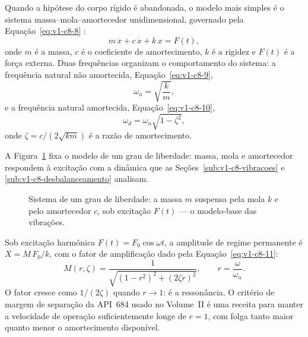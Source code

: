 \documentclass[12pt,a4paper]{article}
\numberwithin{equation}{section}
\numberwithin{table}{section}
\numberwithin{figure}{section}
\begin{document}
Quando a hipótese do corpo rígido é abandonada, o modelo mais simples é o
sistema massa--mola--amortecedor unidimensional, governado pela
Equação~\eqref{eq:v1-c8-8} \cite{rao2011}:
\begin{equation}\label{eq:v1-c8-8}
m\,\ddot{x} + c\,\dot{x} + k\,x = F(t),
\end{equation}
onde $m$ é a massa, $c$ é o coeficiente de amortecimento, $k$ é a rigidez e
$F(t)$ é a força externa. Duas frequências organizam o comportamento do
sistema: a frequência natural não amortecida, Equação~\eqref{eq:v1-c8-9},
\begin{equation}\label{eq:v1-c8-9}
\omega_n = \sqrt{\frac{k}{m}},
\end{equation}
e a frequência natural amortecida, Equação~\eqref{eq:v1-c8-10},
\begin{equation}\label{eq:v1-c8-10}
\omega_d = \omega_n\sqrt{1-\zeta^2},
\end{equation}
onde $\zeta = c/(2\sqrt{km})$ é a razão de amortecimento.

A Figura~\ref{fig:v1-c8-1} fixa o modelo de um grau de liberdade: massa,
mola e amortecedor respondem à excitação com a dinâmica que as
Seções~\ref{sub:v1-c8-vibracoes} e \ref{sub:v1-c8-desbalanceamento}
analisam.

\begin{figure}[H]
\centering
{}
\caption[Sistema massa--mola--amortecedor de um grau de liberdade.]{%
Sistema de um grau de liberdade: a massa $m$ suspensa pela mola $k$ e pelo
amortecedor $c$, sob excitação $F(t)$ --- o modelo-base das vibrações.}
\label{fig:v1-c8-1}
\end{figure}


Sob excitação harmônica $F(t) = F_0\cos\omega t$, a amplitude de regime
permanente é $X = M\,F_0/k$, com o fator de amplificação dado pela
Equação~\eqref{eq:v1-c8-11}:
\begin{equation}\label{eq:v1-c8-11}
M(r,\zeta) = \frac{1}{\sqrt{(1-r^2)^2 + (2\zeta r)^2}}, \qquad
r = \frac{\omega}{\omega_n}.
\end{equation}
O fator cresce como $1/(2\zeta)$ quando $r \to 1$: é a ressonância. O
critério de margem de separação da API~684 usado no Volume~II é uma receita
para manter a velocidade de operação suficientemente longe de $r = 1$, com
folga tanto maior quanto menor o amortecimento disponível.
\end{document}
